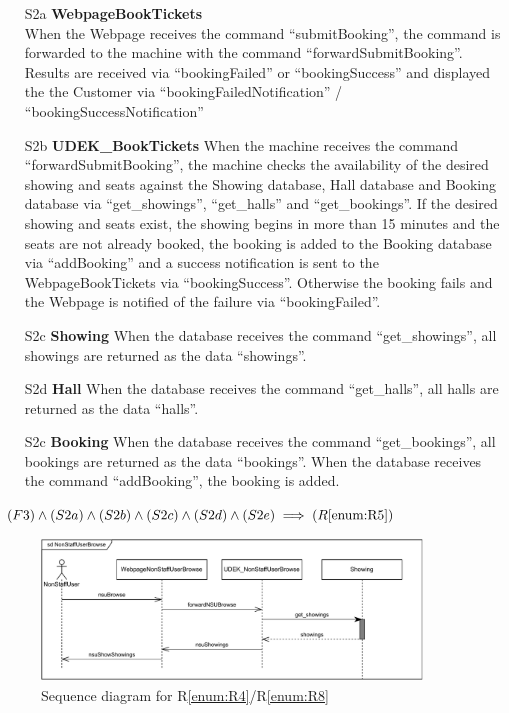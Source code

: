 \documentclass[a4paper,10pt,titlepage,bibtotoc,bibtotocnumbered]{scrreprt}
\begin{document}
\begin{itemize}
\item[S2a] \textbf{WebpageBookTickets}\\
When the Webpage receives the command ``submitBooking'', the command is forwarded to the machine with the command ``forwardSubmitBooking''.
Results are received via ``bookingFailed'' or ``bookingSuccess'' and displayed the the Customer via
``bookingFailedNotification'' / ``bookingSuccessNotification''

\item[S2b] \textbf{UDEK\_BookTickets}
When the machine receives the command ``forwardSubmitBooking'', the machine checks the availability of the desired showing and seats against the Showing database, Hall database and Booking database via ``get\_showings'', ``get\_halls'' and ``get\_bookings''.
If the desired showing and seats exist, the showing begins in more than 15 minutes and the seats are not already booked, the booking is added to the Booking database via ``addBooking'' and a success notification is sent to the WebpageBookTickets via ``bookingSuccess''.
Otherwise the booking fails and the Webpage is notified of the failure via ``bookingFailed''.

\item[S2c] \textbf{Showing}
When the database receives the command ``get\_showings'', all showings are returned as the data ``showings''.

\item[S2d] \textbf{Hall}
When the database receives the command ``get\_halls'', all halls are returned as the data ``halls''.

\item[S2c] \textbf{Booking}
When the database receives the command ``get\_bookings'', all bookings are returned as the data ``bookings''.
When the database receives the command ``addBooking'', the booking is added.

\end{itemize}

$(F3) \land (S2a) \land (S2b) \land (S2c) \land (S2d) \land (S2e) \implies (R\ref{enum:R5})$

\begin{figure}[H]
    \centering
    \includegraphics[width=0.9\textwidth]{figures/05/a05_sequence_diagram_r04r08.pdf}
    \caption{Sequence diagram for R\ref{enum:R4}/R\ref{enum:R8}}
    \label{figure:sdR48}
\end{figure}
\end{document}
